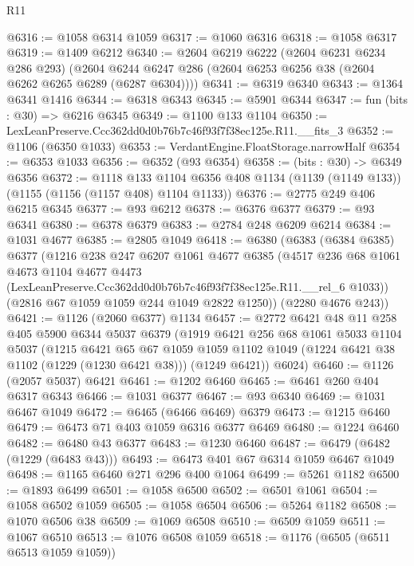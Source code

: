 \begin{lexlean}{R11}
\begin{coremodule}
@6316 := @1058 @6314 @1059
@6317 := @1060 @6316
@6318 := @1058 @6317
@6319 := @1409 @6212
@6340 := @2604
    @6219
    @6222
    (@2604 @6231 @6234 @286 @293)
    (@2604 @6244 @6247 @286 (@2604 @6253 @6256 @38 (@2604 @6262 @6265 @6289 (@6287 @6304))))
@6341 := @6319 @6340
@6343 := @1364 @6341 @1416
@6344 := @6318 @6343
@6345 := @5901 @6344
@6347 := fun (bits : @30) => @6216 @6345
@6349 := @1100 @133 @1104
@6350 := LexLeanPreserve.Ccc362dd0d0b76b7c46f93f7f38ec125e.R11.__fits_3
@6352 := @1106 (@6350 @1033)
@6353 := VerdantEngine.FloatStorage.narrowHalf
@6354 := @6353 @1033
@6356 := @6352 (@93 @6354)
@6358 := (bits : @30) -> @6349 @6356
@6372 := @1118
    @133
    @1104
    @6356
    @408
    @1134
    (@1139 (@1149 @133))
    (@1155 (@1156 (@1157 @408) @1104 @1133))
@6376 := @2775 @249 @406 @6215 @6345
@6377 := @93 @6212
@6378 := @6376 @6377
@6379 := @93 @6341
@6380 := @6378 @6379
@6383 := @2784 @248 @6209 @6214
@6384 := @1031 @4677
@6385 := @2805 @1049
@6418 := @6380
    (@6383
      (@6384 @6385)
      @6377
      (@1216
        @238
        @247
        @6207
        @1061
        @4677
        @6385
        (@4517
          @236
          @68
          @1061
          @4673
          @1104
          @4677
          @4473
          (LexLeanPreserve.Ccc362dd0d0b76b7c46f93f7f38ec125e.R11.__rel_6 @1033))
        (@2816 @67 @1059 @1059 @244 @1049 @2822 @1250))
      (@2280 @4676 @243))
@6421 := @1126 (@2060 @6377) @1134
@6457 := @2772
    @6421
    @48
    @11
    @258
    @405
    @5900
    @6344
    @5037
    @6379
    (@1919
      @6421
      @256
      @68
      @1061
      @5033
      @1104
      @5037
      (@1215
        @6421
        @65
        @67
        @1059
        @1059
        @1102
        @1049
        (@1224 @6421 @38 @1102 (@1229 (@1230 @6421 @38)))
        (@1249 @6421))
      @6024)
@6460 := @1126 (@2057 @5037) @6421
@6461 := @1202 @6460
@6465 := @6461 @260 @404 @6317 @6343
@6466 := @1031 @6377
@6467 := @93 @6340
@6469 := @1031 @6467 @1049
@6472 := @6465 (@6466 @6469) @6379
@6473 := @1215 @6460
@6479 := @6473 @71 @403 @1059 @6316 @6377 @6469
@6480 := @1224 @6460
@6482 := @6480 @43 @6377
@6483 := @1230 @6460
@6487 := @6479 (@6482 (@1229 (@6483 @43)))
@6493 := @6473 @401 @67 @6314 @1059 @6467 @1049
@6498 := @1165 @6460 @271 @296 @400 @1064
@6499 := @5261 @1182
@6500 := @1893 @6499
@6501 := @1058 @6500
@6502 := @6501 @1061
@6504 := @1058 @6502 @1059
@6505 := @1058 @6504
@6506 := @5264 @1182
@6508 := @1070 @6506 @38
@6509 := @1069 @6508
@6510 := @6509 @1059
@6511 := @1067 @6510
@6513 := @1076 @6508 @1059
@6518 := @1176 (@6505 (@6511 @6513 @1059 @1059))

\end{coremodule}
\end{lexlean}
